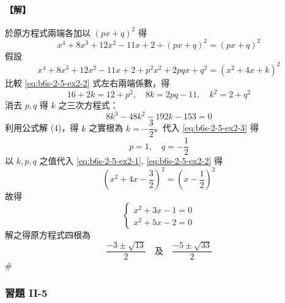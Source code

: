 \paragraph{【解】}
\setcounter{equation}{0}%
於原方程式兩端各加以 $(px+q)^2$ 得
\begin{equation}
x^4 + 8x^3 + 12x^2 - 11x + 2 + (px+q)^2 = (px+q)^2 \label{eq:b6s-2-5-ex2-1}
\end{equation}
假設
\begin{equation}
x^4 + 8x^3 + 12x^2 - 11x + 2 + p^2x^2 + 2pqx + q^2 = (x^2+4x+k)^2 \label{eq:b6s-2-5-ex2-2}
\end{equation}
比較 \eqref{eq:b6s-2-5-ex2-2} 式左右兩端係數，得
\begin{equation}
16 + 2k = 12 + p^2, \quad 8k = 2pq - 11, \quad k^2 = 2 + q^2 \label{eq:b6s-2-5-ex2-3}
\end{equation}
消去 $p, q$ 得 $k$ 之三次方程式：
\begin{equation}
8k^3 - 48k^2 - 192k - 153 = 0 \label{eq:b6s-2-5-ex2-4}
\end{equation}
利用公式解 (4)，得 $k$ 之實根為 $k = -\dfrac{3}{2}$。代入 \eqref{eq:b6s-2-5-ex2-3} 得
\[ p = 1, \quad q = -\dfrac{1}{2} \]
以 $k, p, q$ 之值代入 \eqref{eq:b6s-2-5-ex2-1}, \eqref{eq:b6s-2-5-ex2-2} 得
\[ \left(x^2+4x-\dfrac{3}{2}\right)^2 = \left(x-\dfrac{1}{2}\right)^2 \]
故得
\[ \begin{cases}
x^2 + 3x - 1 = 0 \\
x^2 + 5x - 2 = 0
\end{cases} \]
解之得原方程式四根為
\[ \dfrac{-3 \pm \sqrt{13}}{2} \quad \text{及} \quad \dfrac{-5 \pm \sqrt{33}}{2} \]\hfill$\#$

\subsubsection*{習題 II-5}\label{sec:b6s-ex2-5}

